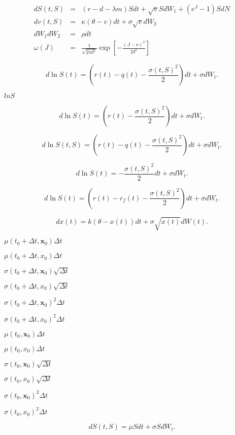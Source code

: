 \documentclass{article}
\begin{document}
\[\begin{array}{rcl}
dS(t, S)  &=& (r-d-\lambda m) S dt +\sqrt{v} S dW_1 + (e^J - 1) S dN \\
dv(t, S)  &=& \kappa (\theta - v) dt + \sigma \sqrt{v} dW_2 \\
dW_1 dW_2 &=& \rho dt \\
\omega(J) &=& \frac{1}{\sqrt{2\pi \delta^2}}
              \exp\left[-\frac{(J-\nu)^2}{2\delta^2}\right]
\end{array}
\]
\pagebreak

\[    d\ln S(t) = (r(t) - q(t) - \frac{\sigma(t, S)^2}{2}) dt
             + \sigma dW_t.
\]
\pagebreak

$ ln S $
\pagebreak

\[    d\ln S(t) = (r(t) - \frac{\sigma(t, S)^2}{2}) dt + \sigma dW_t.
\]
\pagebreak

\[    d\ln S(t, S) = (r(t) - q(t) - \frac{\sigma(t, S)^2}{2}) dt
             + \sigma dW_t.
\]
\pagebreak

\[    d\ln S(t) = -\frac{\sigma(t, S)^2}{2} dt + \sigma dW_t.
\]
\pagebreak

\[    d\ln S(t) = (r(t) - r_f(t) - \frac{\sigma(t, S)^2}{2}) dt
             + \sigma dW_t.
\]
\pagebreak

\[    dx(t) = k (\theta - x(t)) dt + \sigma \sqrt{x(t)} dW(t).
\]
\pagebreak

$ \mu(t_0 + \Delta t, \mathbf{x}_0) \Delta t $
\pagebreak

$ \mu(t_0 + \Delta t, x_0) \Delta t $
\pagebreak

$ \sigma(t_0 + \Delta t, \mathbf{x}_0) \sqrt{\Delta t} $
\pagebreak

$ \sigma(t_0 + \Delta t, x_0) \sqrt{\Delta t} $
\pagebreak

$ \sigma(t_0 + \Delta t, \mathbf{x}_0)^2 \Delta t $
\pagebreak

$ \sigma(t_0 + \Delta t, x_0)^2 \Delta t $
\pagebreak

$ \mu(t_0, \mathbf{x}_0) \Delta t $
\pagebreak

$ \mu(t_0, x_0) \Delta t $
\pagebreak

$ \sigma(t_0, \mathbf{x}_0) \sqrt{\Delta t} $
\pagebreak

$ \sigma(t_0, x_0) \sqrt{\Delta t} $
\pagebreak

$ \sigma(t_0, \mathbf{x}_0)^2 \Delta t $
\pagebreak

$ \sigma(t_0, x_0)^2 \Delta t $
\pagebreak

\[    dS(t, S)= \mu S dt + \sigma S dW_t.
\]
\pagebreak
\end{document}
